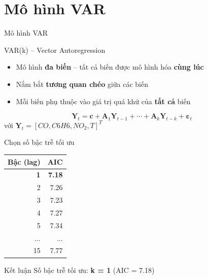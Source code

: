 \documentclass[serif, aspectratio=169]{beamer}
\newcommand{\highlight}[1]{\textbf{\color{hkustblue}#1}}
\newcommand{\red}[1]{\textbf{\color{hkustred}#1}}
\begin{document}
\section{Mô hình VAR}

\begin{frame}{Mô hình VAR}
    \begin{block}{VAR(k) -- Vector Autoregression}
        \begin{itemize}
            \item Mô hình \highlight{đa biến} -- tất cả biến được mô hình hóa \highlight{cùng lúc}
            \item Nắm bắt \highlight{tương quan chéo} giữa các biến
            \item Mỗi biến phụ thuộc vào giá trị quá khứ của \highlight{tất cả} biến
        \end{itemize}
    \end{block}
    
    \vspace{0.3cm}
    \begin{equation*}
        \mathbf{Y}_t = \mathbf{c} + \mathbf{A}_1 \mathbf{Y}_{t-1} + \cdots + \mathbf{A}_k \mathbf{Y}_{t-k} + \boldsymbol{\varepsilon}_t
    \end{equation*}
    với $\mathbf{Y}_t = [CO, C6H6, NO_2, T]^T$
\end{frame}

\begin{frame}{Chọn số bậc trễ tối ưu}
    \begin{center}
        \begin{tabular}{|r|r|}
            \hline
            \textbf{Bậc (lag)} & \textbf{AIC} \\ \hline
            \red{1} & \red{7.18} \\ \hline
            2 & 7.26 \\ \hline
            3 & 7.23 \\ \hline
            4 & 7.27 \\ \hline
            5 & 7.34 \\ \hline
            ... & ... \\ \hline
            15 & 7.77 \\ \hline
        \end{tabular}
    \end{center}
    
    \vspace{0.4cm}
    \begin{block}{Kết luận}
        Số bậc trễ tối ưu: \highlight{k = 1} (AIC = 7.18)
    \end{block}
\end{frame}
\end{document}
